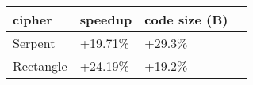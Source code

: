 \begin{tabular}{|l K{3cm}|K{3cm}|K{3cm}|}
  \hline
  \textbf{cipher} & \textbf{speedup} & \textbf{code size (B)}\\
  \hline
  Serpent & +19.71\% & +29.3\% \\
  \hline
  Rectangle & +24.19\% & +19.2\% \\
  \hline
\end{tabular}